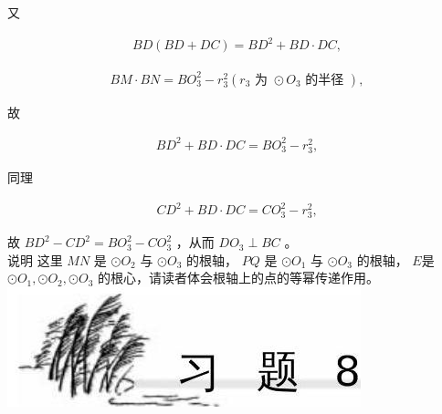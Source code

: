\documentclass[10pt]{article}
\begin{document}
又

\begin{align*}
B D(B D+D C)=B D^{2}+B D \cdot D C,
\end{align*}

\begin{align*}
B M \cdot B N=B O_{3}^{2}-r_{3}^{2}\left(r_{3} \text { 为 } \odot O_{3} \text { 的半径 }\right),
\end{align*}

故

\begin{align*}
B D^{2}+B D \cdot D C=B O_{3}^{2}-r_{3}^{2},
\end{align*}

同理

\begin{align*}
C D^{2}+B D \cdot D C=C O_{3}^{2}-r_{3}^{2},
\end{align*}

故 $B D^{2}-C D^{2}=B O_{3}^{2}-C O_{3}^{2}$ ，从而 $D O_{3} \perp B C$ 。\\
说明 这里 $M N$ 是 $\odot O_{2}$ 与 $\odot O_{3}$ 的根轴， $P Q$ 是 $\odot O_{1}$ 与 $\odot O_{3}$ 的根轴， $E$是 $\odot O_{1}, \odot O_{2}, \odot O_{3}$ 的根心，请读者体会根轴上的点的等幂传递作用。\\
\includegraphics[max width=\textwidth, center]{2024_10_30_66b8e5e701da2093c133g-063(1)}
\end{document}
